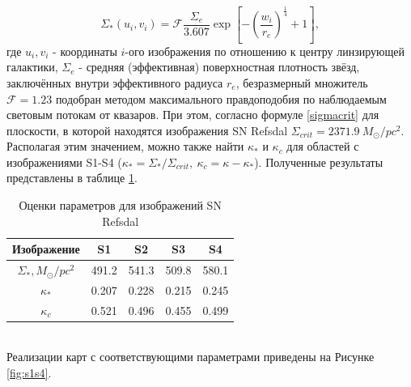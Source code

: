 \begin{equation}\label{vaucouleurs}
\Sigma_*\left(u_{i}, v_{i}\right)=\mathcal{F} \frac{\Sigma_{e}}{3.607} \exp \left[-\left(\frac{w_{i}}{r_{e}}\right)^{\frac{1}{4}}+1\right], 
\end{equation}
где $u_{i}, v_{i}$ - координаты $i$-ого изображения по отношению к центру линзирующей галактики, $\Sigma_e$ - средняя (эффективная) поверхностная плотность звёзд, заключённых внутри эффективного радиуса $r_e$, безразмерный множитель $\mathcal{F}=1.23$ подобран методом максимального правдоподобия по наблюдаемым световым потокам от квазаров. При этом, согласно формуле \eqref{sigmacrit} для плоскости, в которой находятся изображения SN Refsdal  $\Sigma_{crit} = 2371.9 \ M_{\odot}/pc^2 $. Располагая этим значением, можно также найти $\kappa_*$ и $\kappa_c$ для областей с изображениями S1-S4 ($\kappa_*=\Sigma_* /\Sigma_{crit}, \ \kappa_c = \kappa-\kappa_* $). Полученные результаты представлены в таблице \ref{tab:params}.

\begin{table}[H]
  \caption{Оценки параметров для изображений SN Refsdal}
   \label{tab:params}
  \centering
    \begin{tabular}{ | c | c | c | c | c |}
    \hline
    Изображение & S1 & S2 & S3 & S4 \\ \hline
    $\Sigma_*, M_{\odot}/pc^2$ & 491.2 & 541.3 & 509.8 & 580.1\\ \hline
    $\kappa_*$ & 0.207 &  0.228 & 0.215 & 0.245 \\ \hline
    $\kappa_c$ & 0.521 & 0.496 & 0.455 & 0.499 \\ \hline
    \end{tabular}
\end{table}
\\
Реализации карт с соответствующими параметрами приведены на Рисунке \ref{fig:s1s4}.


